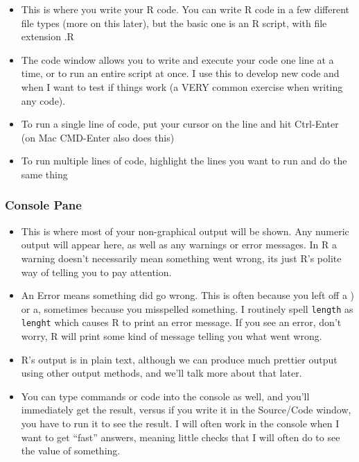 \documentclass[
]{article}
\begin{document}
\begin{itemize}
\item
  This is where you write your R code. You can write R code in a few different file types (more on this later), but the basic one is an R script, with file extension .R
\item
  The code window allows you to write and execute your code one line at a time, or to run an entire script at once. I use this to develop new code and when I want to test if things work (a VERY common exercise when writing any code).
\item
  To run a single line of code, put your cursor on the line and hit Ctrl-Enter (on Mac CMD-Enter also does this)
\item
  To run multiple lines of code, highlight the lines you want to run and do the same thing
\end{itemize}

\hypertarget{console-pane}{%
\subsubsection{Console Pane}\label{console-pane}}

\begin{itemize}
\item
  This is where most of your non-graphical output will be shown. Any numeric output will appear here, as well as any warnings or error messages. In R a warning doesn't necessarily mean something went wrong, its just R's polite way of telling you to pay attention.
\item
  An Error means something did go wrong. This is often because you left off a ) or a, sometimes because you misspelled something. I routinely spell \texttt{length} as \texttt{lenght} which causes R to print an error message. If you see an error, don't worry, R will print some kind of message telling you what went wrong.
\item
  R's output is in plain text, although we can produce much prettier output using other output methods, and we'll talk more about that later.
\item
  You can type commands or code into the console as well, and you'll immediately get the result, versus if you write it in the Source/Code window, you have to run it to see the result. I will often work in the console when I want to get ``fast'' answers, meaning little checks that I will often do to see the value of something.
\end{itemize}
\end{document}

